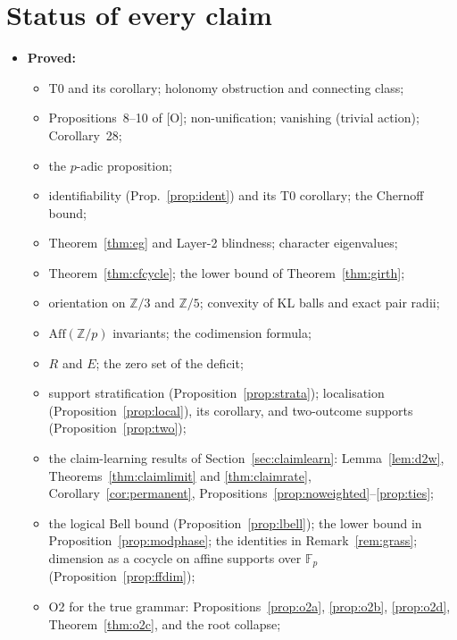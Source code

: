 \documentclass[11pt]{article}
\theoremstyle{definition}
\theoremstyle{remark}
\newcommand{\Z}{\mathbb{Z}}
\newcommand{\F}{\mathbb{F}}
\newcommand{\Aff}{\mathrm{Aff}}
\newcommand{\src}[1]{\textsf{\small[#1]}}
\begin{document}
\section{Status of every claim}
\begin{itemize}
  \item \textbf{Proved:}
  \begin{itemize}
    \item T0 and its corollary; holonomy obstruction and connecting class;
    \item Propositions~8--10 of \src{O}; non-unification; vanishing (trivial action); Corollary~28;
    \item the $p$-adic proposition;
    \item identifiability (Prop.~\ref{prop:ident}) and its T0 corollary; the Chernoff bound;
    \item Theorem~\ref{thm:eg} and Layer-2 blindness; character eigenvalues;
    \item Theorem~\ref{thm:cfcycle}; the lower bound of Theorem~\ref{thm:girth};
    \item orientation on $\Z/3$ and $\Z/5$; convexity of KL balls and exact pair radii;
    \item $\Aff(\Z/p)$ invariants; the codimension formula;
    \item $R$ and $E$; the zero set of the deficit;
    \item support stratification (Proposition~\ref{prop:strata}); localisation (Proposition~\ref{prop:local}), its corollary, and two-outcome supports (Proposition~\ref{prop:two});
    \item the claim-learning results of Section~\ref{sec:claimlearn}: Lemma~\ref{lem:d2w}, Theorems~\ref{thm:claimlimit} and \ref{thm:claimrate}, Corollary~\ref{cor:permanent}, Propositions~\ref{prop:noweighted}--\ref{prop:ties};
    \item the logical Bell bound (Proposition~\ref{prop:lbell}); the lower bound in Proposition~\ref{prop:modphase}; the identities in Remark~\ref{rem:grass}; dimension as a cocycle on affine supports over $\F_p$ (Proposition~\ref{prop:ffdim});
    \item O2 for the true grammar: Propositions~\ref{prop:o2a}, \ref{prop:o2b}, \ref{prop:o2d}, Theorem~\ref{thm:o2c}, and the root collapse;

\end{itemize}
\end{itemize}
\end{document}

